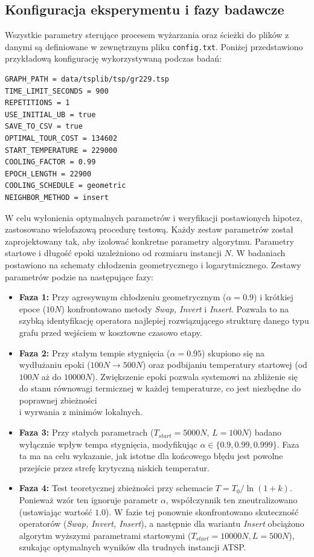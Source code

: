 \documentclass[conference]{IEEEtran}
\begin{document}
        \subsection{Konfiguracja eksperymentu i fazy badawcze}
            Wszystkie parametry sterujące procesem wyżarzania oraz ścieżki do plików z danymi są definiowane w zewnętrznym pliku \texttt{config.txt}. Poniżej przedstawiono przykładową konfigurację wykorzystywaną podczas badań:
\begin{verbatim}
GRAPH_PATH = data/tsplib/tsp/gr229.tsp
TIME_LIMIT_SECONDS = 900
REPETITIONS = 1
USE_INITIAL_UB = true
SAVE_TO_CSV = true
OPTIMAL_TOUR_COST = 134602
START_TEMPERATURE = 229000
COOLING_FACTOR = 0.99
EPOCH_LENGTH = 22900
COOLING_SCHEDULE = geometric
NEIGHBOR_METHOD = insert
\end{verbatim}
            W celu wyłonienia optymalnych parametrów i weryfikacji postawionych hipotez, zastosowano wielofazową procedurę testową. Każdy zestaw parametrów został zaprojektowany tak, aby izolować konkretne parametry algorytmu. Parametry startowe i długość epoki uzależniono od rozmiaru instancji $N$. W badaniach postawiono na schematy chłodzenia geometrycznego i logarytmicznego. Zestawy parametrów podzie na następujące fazy: 
            \begin{itemize}
                \item \textbf{Faza 1:} Przy agresywnym chłodzeniu geometrycznym ($\alpha=0.9$) i krótkiej epoce ($10N$) konfrontowano metody \textit{Swap, Invert} i \textit{Insert}. Pozwala to na szybką identyfikację operatora najlepiej rozwiązującego strukturę danego typu grafu przed wejściem w kosztowne czasowo etapy.
                \item \textbf{Faza 2:} Przy stałym tempie stygnięcia ($\alpha=0.95$) skupiono się na wydłużaniu epoki ($100N \rightarrow 500N$) oraz podbijaniu temperatury startowej (od $100N$ aż do $10000N$). Zwiększenie epoki pozwala systemowi na zbliżenie się do stanu równowagi termicznej w każdej temperaturze, co jest niezbędne do poprawnej zbieżności \\ i wyrwania z minimów lokalnych.
                \item \textbf{Faza 3:} Przy stałych parametrach ($T_{start}=5000N$, $L=100N$) badano wyłącznie wpływ tempa stygnięcia, modyfikując $\alpha \in \{0.9, 0.99, 0.999\}$. Faza ta ma na celu wykazanie, jak istotne dla końcowego błędu jest powolne przejście przez strefę krytyczną niskich temperatur.
                \item \textbf{Faza 4:} Test teoretycznej zbieżności przy schemacie $T = T_0 / \ln(1+k)$. Ponieważ wzór ten ignoruje parametr $\alpha$, współczynnik ten zneutralizowano (ustawiając wartość $1.0$). W fazie tej ponownie skonfrontowano skuteczność operatorów (\textit{Swap, Invert, Insert}), a następnie dla wariantu \textit{Insert} obciążono algorytm wyższymi parametrami startowymi ($T_{start}=10000N, L=500N$), szukając optymalnych wyników dla trudnych instancji ATSP.
            \end{itemize}
\end{document}
